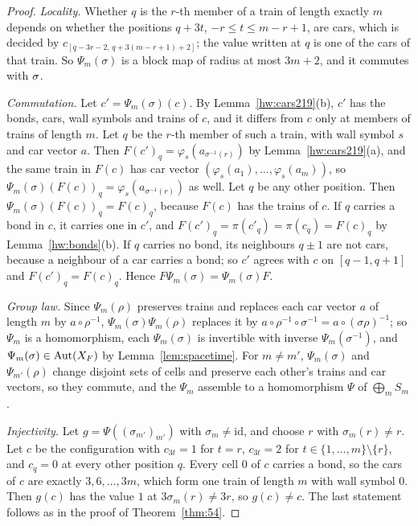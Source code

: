 \begin{proof}
\emph{Locality.} Whether $q$ is the $r$-th member of a train of length exactly $m$ depends on whether the positions $q+3t$, $-r\le t\le m-r+1$, are cars, which is decided by $c_{[q-3r-2,\,q+3(m-r+1)+2]}$; the value written at $q$ is one of the cars of that train. So $\Psi_m(\sigma)$ is a block map of radius at most $3m+2$, and it commutes with $\sigma$.

\emph{Commutation.} Let $c'=\Psi_m(\sigma)(c)$. By Lemma~\ref{hw:cars219}(b), $c'$ has the bonds, cars, wall symbols and trains of $c$, and it differs from $c$ only at members of trains of length $m$. Let $q$ be the $r$-th member of such a train, with wall symbol $s$ and car vector $a$. Then $F(c')_q=\varphi_s(a_{\sigma^{-1}(r)})$ by Lemma~\ref{hw:cars219}(a), and the same train in $F(c)$ has car vector $(\varphi_s(a_1),\dots,\varphi_s(a_m))$, so $\Psi_m(\sigma)(F(c))_q=\varphi_s(a_{\sigma^{-1}(r)})$ as well. Let $q$ be any other position. Then $\Psi_m(\sigma)(F(c))_q=F(c)_q$, because $F(c)$ has the trains of $c$. If $q$ carries a bond in $c$, it carries one in $c'$, and $F(c')_q=\pi(c'_q)=\pi(c_q)=F(c)_q$ by Lemma~\ref{hw:bonds}(b). If $q$ carries no bond, its neighbours $q\pm1$ are not cars, because a neighbour of a car carries a bond; so $c'$ agrees with $c$ on $[q-1,q+1]$ and $F(c')_q=F(c)_q$. Hence $F\Psi_m(\sigma)=\Psi_m(\sigma)F$.

\emph{Group law.} Since $\Psi_m(\rho)$ preserves trains and replaces each car vector $a$ of length $m$ by $a\circ\rho^{-1}$, $\Psi_m(\sigma)\Psi_m(\rho)$ replaces it by $a\circ\rho^{-1}\circ\sigma^{-1}=a\circ(\sigma\rho)^{-1}$; so $\Psi_m$ is a homomorphism, each $\Psi_m(\sigma)$ is invertible with inverse $\Psi_m(\sigma^{-1})$, and $\Psi_m(\sigma)\in\operatorname{Aut}(X_F)$ by Lemma~\ref{lem:spacetime}. For $m\ne m'$, $\Psi_m(\sigma)$ and $\Psi_{m'}(\rho)$ change disjoint sets of cells and preserve each other's trains and car vectors, so they commute, and the $\Psi_m$ assemble to a homomorphism $\Psi$ of $\bigoplus_mS_m$.

\emph{Injectivity.} Let $g=\Psi((\sigma_{m'})_{m'})$ with $\sigma_m\ne\mathrm{id}$, and choose $r$ with $\sigma_m(r)\ne r$. Let $c$ be the configuration with $c_{3t}=1$ for $t=r$, $c_{3t}=2$ for $t\in\{1,\dots,m\}\setminus\{r\}$, and $c_q=0$ at every other position $q$. Every cell $0$ of $c$ carries a bond, so the cars of $c$ are exactly $3,6,\dots,3m$, which form one train of length $m$ with wall symbol $0$. Then $g(c)$ has the value $1$ at $3\sigma_m(r)\ne3r$, so $g(c)\ne c$. The last statement follows as in the proof of Theorem~\ref{thm:54}.
\end{proof}

